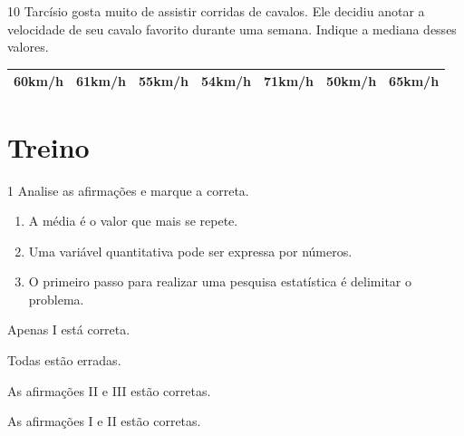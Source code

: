 \num{10} Tarcísio gosta muito de assistir corridas de cavalos. Ele decidiu
anotar a velocidade de seu cavalo favorito durante uma semana. Indique a
mediana desses valores.

\begin{longtable}[]{@{}lllllll@{}}
\toprule
\endhead
60km/h & 61km/h & 55km/h & 54km/h & 71km/h & 50km/h &
65km/h\tabularnewline
\bottomrule
\end{longtable}


\section*{Treino} \EP[2]

\num{1} Analise as afirmações e marque a correta.

\begin{enumerate}
\item A média é o valor que mais se repete.

\item Uma variável quantitativa pode ser expressa por números.

\item O primeiro passo para realizar uma pesquisa estatística é
delimitar o problema.
\end{enumerate}


\begin{escolha}[itemsep=0pt]
\item Apenas I está correta.
\item Todas estão erradas.
\item As afirmações II e III estão corretas.
\item As afirmações I e II estão corretas.
\end{escolha}


